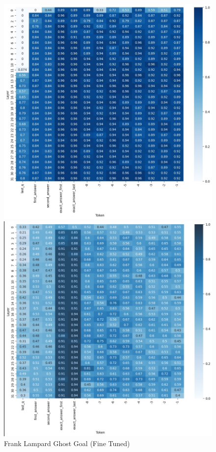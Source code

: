 \documentclass[sigconf, review]{acmart}
\begin{document}
\begin{enumerate}
     \begin{figure}[ht]
         \centering
         \begin{minipage}{0.35\textwidth}
             \centering
             \includegraphics[width=\linewidth]{frank-positive-class.jpg}
             \caption{\footnotesize Frank Lampard Ghost Goal (Fine Tuned)}
             \label{fig:frank-positive-class}
         \end{minipage}
         \hfill
         \begin{minipage}{0.35\textwidth}
             \centering
             \includegraphics[width=\linewidth]{Suarez-positive-probing.jpg}

\end{minipage}
\end{figure}
\end{enumerate}
\end{document}

